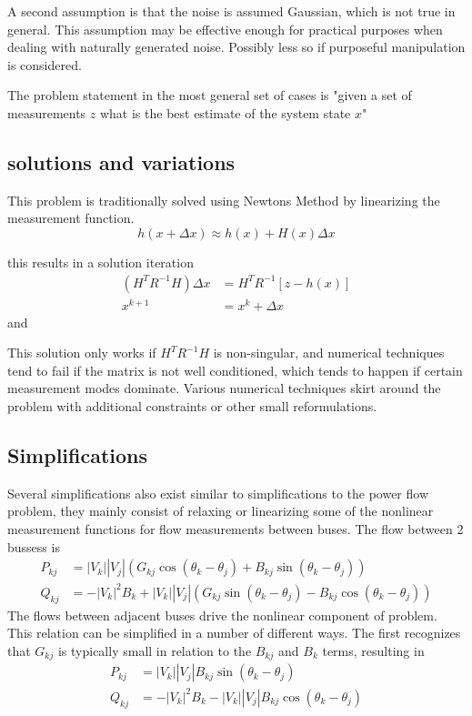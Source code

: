 \documentclass[11pt]{article} %
\begin{document}
A second assumption is that the noise is assumed Gaussian,  which is not true in general. This assumption may be effective enough for practical purposes when dealing with naturally generated noise.  Possibly less so if purposeful manipulation is considered.

The problem statement in the most general set of cases is "given a set of measurements $z$ what is the best estimate of the system state $x$"
\subsection{solutions and variations}
This problem is traditionally solved using Newtons Method by linearizing the measurement function.
\begin{equation}
h(x+\Delta x) \approx h(x)+H(x)\Delta x
\end{equation}

this results in a solution iteration
\begin{equation}
\begin{aligned}
\left(H^TR^{-1}H\right)\Delta x &= H^TR^{-1}\left[z-h(x)\right] \\
x^{k+1} &= x^k+\Delta x
\end{aligned}
\end{equation}
and


This solution only works if $H^TR^{-1}H$ is non-singular,  and numerical techniques tend to fail if the matrix is not well conditioned, which tends to happen if certain measurement modes dominate.  Various numerical techniques skirt around the problem with additional constraints or other small reformulations.



\subsection{Simplifications}
Several simplifications also exist similar to simplifications to the power flow problem, they mainly consist of relaxing or linearizing some of the nonlinear measurement functions for flow measurements between buses.  The flow between 2 bussess is
\begin{equation}\label{Eq:powerflow}
\begin{aligned}
P_{kj} &= |V_k||V_j|\left(G_{kj}\cos(\theta_k-\theta_j) +  B_{kj}\sin(\theta_k-\theta_j)\right)\\
Q_{kj} &=  -|V_k|^2 B_{k}+|V_k||V_j|\left(G_{kj}\sin(\theta_k-\theta_j) - B_{kj}\cos(\theta_k-\theta_j)\right)
\end{aligned}
\end{equation}
The flows between adjacent buses drive the nonlinear component of problem.  This relation can be simplified in a number of different ways.  The first recognizes that $G_{kj}$ is typically small in relation to the $B_{kj}$ and $B_k$ terms,  resulting in
\begin{equation}\label{Eq:powerflow}
\begin{aligned}
P_{kj} &= |V_k||V_j| B_{kj}\sin(\theta_k-\theta_j)\\
Q_{kj} &=  -|V_k|^2 B_{k}-|V_k||V_j| B_{kj}\cos(\theta_k-\theta_j)
\end{aligned}
\end{equation}
\end{document}
